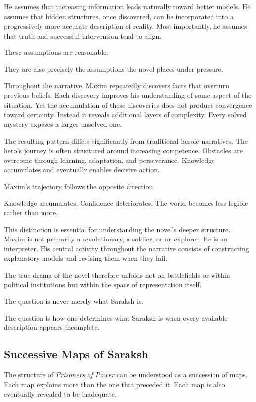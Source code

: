 \documentclass[12pt, a4paper]{article}
\theoremstyle{plain}
\theoremstyle{definition}
\theoremstyle{remark}
\begin{document}
He assumes that increasing information leads
naturally toward better models. He assumes that
hidden structures, once discovered, can be
incorporated into a progressively more accurate
description of reality. Most importantly, he
assumes that truth and successful intervention
tend to align.

These assumptions are reasonable.

They are also precisely the assumptions the novel
places under pressure.

Throughout the narrative, Maxim repeatedly
discovers facts that overturn previous beliefs.
Each discovery improves his understanding of
some aspect of the situation. Yet the accumulation
of these discoveries does not produce convergence
toward certainty. Instead it reveals additional
layers of complexity. Every solved mystery exposes
a larger unsolved one.

The resulting pattern differs significantly from
traditional heroic narratives. The hero's journey
is often structured around increasing competence.
Obstacles are overcome through learning, adaptation,
and perseverance. Knowledge accumulates and
eventually enables decisive action.

Maxim's trajectory follows the opposite direction.

Knowledge accumulates.
Confidence deteriorates.
The world becomes less legible rather than more.

This distinction is essential for understanding
the novel's deeper structure. Maxim is not
primarily a revolutionary, a soldier, or an
explorer. He is an interpreter. His central
activity throughout the narrative consists of
constructing explanatory models and revising them
when they fail.

The true drama of the novel therefore unfolds
not on battlefields or within political institutions
but within the space of representation itself.

The question is never merely what Saraksh is.

The question is how one determines what Saraksh
is when every available description appears
incomplete.

\subsection{Successive Maps of Saraksh}

The structure of \textit{Prisoners of Power} can
be understood as a succession of maps. Each map
explains more than the one that preceded it. Each
map is also eventually revealed to be inadequate.
\end{document}
